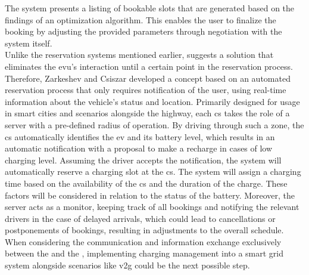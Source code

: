 The system presents a listing of bookable slots that are generated based on the findings of an optimization algorithm. This enables the user to finalize the booking by adjusting the provided parameters through negotiation with the system itself. \\
\noindent Unlike the reservation systems mentioned earlier, \cite{zarkeshev_charging_2018} suggests a solution that eliminates the \acrshort{evu}'s interaction until a certain point in the reservation process.
Therefore, Zarkeshev and Csiszar developed a concept based on an automated reservation process that only requires notification of the user, using real-time information about the vehicle's status and location.
Primarily designed for usage in smart cities and scenarios alongside the highway, each \acrshort{cs} takes the role of a server with a pre-defined radius of operation. By driving through such a zone, the \acrshort{cs} automatically identifies the \acrshort{ev} and its battery level, which results in an automatic notification with a proposal to make a recharge in cases of low charging level. 
Assuming the driver accepts the notification, the system will automatically reserve a charging slot at the \acrshort{cs}. The system will assign a charging time based on the availability of the \acrshort{cs} and the duration of the charge. These factors will be considered in relation to the status of the battery.
Moreover, the server acts as a monitor, keeping track of all bookings and notifying the relevant drivers in the case of delayed arrivals, which could lead to cancellations or postponements of bookings, resulting in adjustments to the overall schedule. \\
\noindent When considering the communication and information exchange exclusively between the  and the , implementing charging management into a smart grid system alongside scenarios like \acrshort{v2g} could be the next possible step. 
